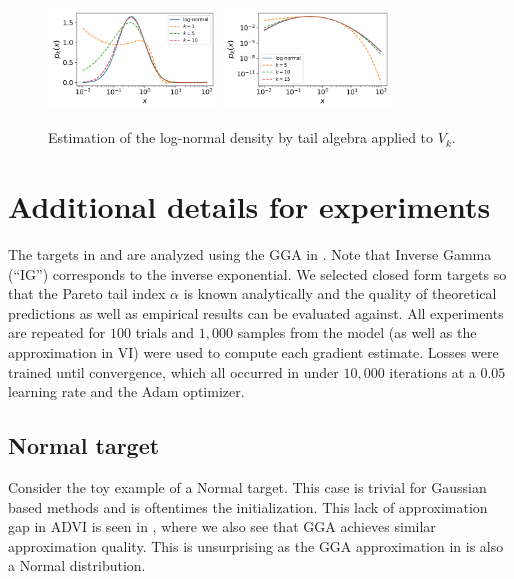 \documentclass[thesis.tex]{subfiles}
\begin{document}
\begin{figure}[h]
	\centering
	\includegraphics[width=0.4\textwidth]{figures/LogNormal_Bulk.png}
	\includegraphics[width=0.4\textwidth]{figures/LogNormal_Tail.png}
	\caption{Estimation of the log-normal density by tail algebra applied to $V_k$.}
	\label{fig:lognormal}
\end{figure}

\section{Additional details for experiments}



The targets in  and  are analyzed using
the GGA in . Note that Inverse Gamma (``IG'') corresponds
to the inverse exponential. We selected closed form targets so that
the Pareto tail index $\alpha$ is known analytically and the quality
of theoretical predictions as well as empirical results can be evaluated
against. All experiments are repeated for $100$ trials and $1,000$ samples
from the model (as well as the approximation in VI) were used to compute
each gradient estimate. Losses were trained until convergence, which 
all occurred in under $10,000$ iterations at a $0.05$ learning rate and
the Adam \citep{kingma2014adam} optimizer.



\subsection{Normal target}

Consider the toy example of a Normal target. This case is trivial for
Gaussian based methods and is oftentimes the initialization.
This lack of approximation gap in ADVI is seen in ,
where we also see that GGA achieves similar approximation quality.
This is unsurprising as the GGA approximation in 
is also a Normal distribution.
\end{document}
